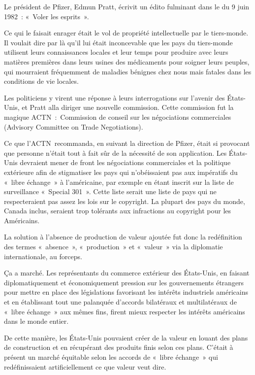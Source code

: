 Le président de Pfizer, Edmun Pratt, écrivit un édito fulminant dans le  du 9 juin 1982~: «~Voler les esprits~». 

Ce qui le faisait enrager était le vol de propriété
intellectuelle
par le tiers-monde. Il voulait dire par là qu'il lui était inconcevable que les pays du tiers-monde utilisent leurs connaissances locales et leur temps pour produire avec leurs matières premières dans
leurs usines des médicaments pour soigner leurs peuples, qui mourraient fréquemment de maladies bénignes chez nous mais fatales dans les conditions de vie locales. 

Les politiciens y virent une réponse
à leurs interrogations sur l'avenir des États-Unis, et Pratt alla diriger une nouvelle commission. Cette commission fut la magique ACTN~: Commission de conseil sur les négociations commerciales (Advisory Committee on Trade Negotiations).

Ce que l'ACTN recommanda, en suivant la direction de Pfizer, était si provocant que personne n'était tout à fait sûr de la nécessité de son application. Les États-Unis devraient mener de front les
négociations commerciales et la politique extérieure afin de stigmatiser les pays qui n'obéissaient pas aux impératifs du «~libre échange~» à l'américaine, par exemple en étant inscrit sur la liste
de surveillance «~Special 301~». Cette liste serait une liste de pays qui ne respecteraient pas assez les lois sur le copyright. La plupart des pays du monde, Canada inclus, seraient trop tolérants aux
infractions au copyright pour les Américains.

La solution à l'absence de production de valeur ajoutée fut donc la redéfinition des termes «~absence~», «~production~» et «~valeur~» via la diplomatie internationale, au forceps. 

Ça a marché.
Les représentants du commerce extérieur des États-Unis, en faisant diplomatiquement et économiquement pression sur les gouvernements étrangers pour mettre en place des législations favorisant les
intérêts industriels américains et en établissant tout une palanquée d'accords bilatéraux et multilatéraux de «~libre échange~» aux mêmes fins, firent mieux respecter les intérêts américains dans le
monde entier.

De cette manière, les États-Unis pouvaient créer de la valeur en louant des plans de construction et en récupérant des produits finis selon ces plans. C'était à présent un marché équitable selon les
accords de «~libre échange~» qui redéfinissaient artificiellement ce que valeur veut dire.


